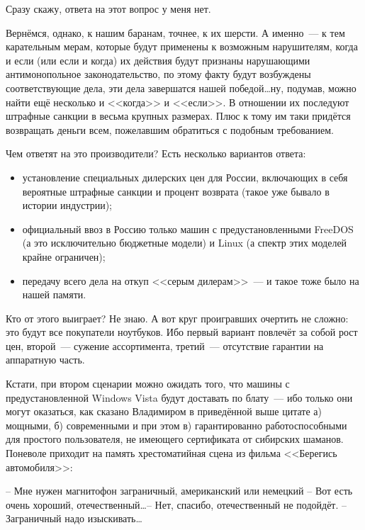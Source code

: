 Сразу скажу, ответа на этот вопрос у меня нет.

Вернёмся, однако, к нашим баранам, точнее, к их шерсти. А именно~--- к тем карательным мерам, которые будут применены к возможным нарушителям, когда и если (или если и когда) их действия будут признаны нарушающими антимонопольное законодательство, по этому факту будут возбуждены соответствующие дела, эти дела завершатся нашей победой\dots ну, подумав, можно найти ещё несколько и <<когда>> и <<если>>. В отношении их последуют штрафные санкции в весьма крупных размерах. Плюс к тому им таки придётся возвращать деньги всем, пожелавшим обратиться с подобным требованием.

Чем ответят на это производители? Есть несколько вариантов ответа:

\begin{itemize}
	\item установление специальных дилерских цен для России, включающих в себя вероятные штрафные санкции и процент возврата (такое уже бывало в истории индустрии); 
	\item официальный ввоз в Россию только машин с предустановленными FreeDOS (а это исключительно бюджетные модели) и Linux (а спектр этих моделей крайне ограничен); 
	\item передачу всего дела на откуп <<серым дилерам>>~--- и такое тоже было на нашей памяти. 
\end{itemize}



Кто от этого выиграет? Не знаю. А вот круг проигравших очертить не сложно: это будут все покупатели ноутбуков. Ибо первый вариант повлечёт за собой рост цен, второй~--- сужение ассортимента, третий~--- отсутствие гарантии на аппаратную часть.

Кстати, при втором сценарии можно ожидать того, что машины с предустановленной Windows Vista будут доставать по блату~--- ибо только они могут оказаться, как сказано Владимиром в приведённой выше цитате а)  мощными, б) современными и при этом в) гарантированно работоспособными для простого пользователя, не имеющего сертификата от сибирских шаманов. Поневоле приходит на память хрестоматийная сцена из фильма <<Берегись автомобиля>>:


\begin{shadequote}{}
-- Мне нужен магнитофон заграничный, американский или немецкий -- Вот есть очень хороший, отечественный\dots -- Нет, спасибо, отечественный не подойдёт. -- Заграничный надо изыскивать\dots
\end{shadequote}

